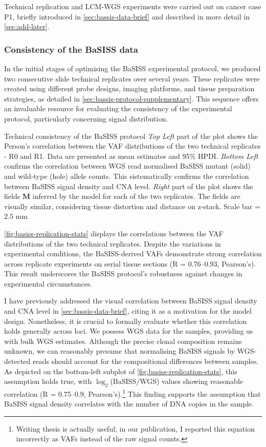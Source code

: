Technical replication and \ac{LCM}-\ac{WGS} experiments were carried out on cancer case P1, briefly introduced in \cref{sec:bassis-data-brief} and described in more detail in \cref{sec:add-later}.

\subsubsection*{Consistency of the BaSISS data}
In the initial stages of optimising the \ac{BaSISS} experimental protocol, we produced two consecutive slide technical replicates over several years. These replicates were created using different probe designs, imaging platforms, and tissue preparation strategies, as detailed in \cref{sec:bassis-protocol-supplementary}. This sequence offers an invaluable resource for evaluating the consistency of the experimental protocol, particularly concerning signal distribution.

    {Technical consistency of the \ac{BaSISS} protocol}
    {\emph{Top Left} part of the plot shows the Person's correlation between the \ac{VAF} distributions of the two technical replicates - R0 and R1. Data are presented as mean
    estimates and 95\% HPDI. \emph{Bottom Left} confirms the correlation between \ac{WGS} read normalised \ac{BaSISS} mutant (solid) and wild-type (hole) allele counts. This sistematically confirms the correlation between \ac{BaSISS} signal density and \ac{CNA} level. \emph{Right} part of the plot shows the fields $\mathbf{M}$ inferred by the model for each of the two replicates. The fields are visually similar, considering tissue distortion and distance on z-stack. Scale bar = 2.5 mm}

\cref{fig:basiss-replication-stats} displays the correlations between the \ac{VAF} distributions of the two technical replicates. Despite the variations in experimental conditions, the \ac{BaSISS}-derived \ac{VAF}s demonstrate strong correlation across replicate experiments on serial tissue sections (R = 0.76–0.93, Pearson's). This result underscores the \ac{BaSISS} protocol's robustness against changes in experimental circumstances.

I have previously addressed the visual correlation between \ac{BaSISS} signal density and \ac{CNA} level in \cref{sec:bassis-data-brief}, citing it as a motivation for the model design. Nonetheless, it is crucial to formally evaluate whether this correlation holds generally across loci. We possess \ac{WGS} data for the samples, providing us with bulk \ac{WGS} estimates. Although the precise clonal composition remains unknown, we can reasonably presume that normalising \ac{BaSISS} signals by \ac{WGS}-detected reads should account for the compositional differences between samples. As depicted on the bottom-left subplot of \cref{fig:basiss-replication-stats}, this assumption holds true, with $\log_2$(BaSISS/WGS) values showing reasonable correlation (R = 0.75–0.9, Pearson’s).\footnote{Writing thesis is actually useful; in our publication, I reported this equation incorrectly as \ac{VAF}s instead of the raw signal counts.} This finding supports the assumption that \ac{BaSISS} signal density correlates with the number of DNA copies in the sample.

